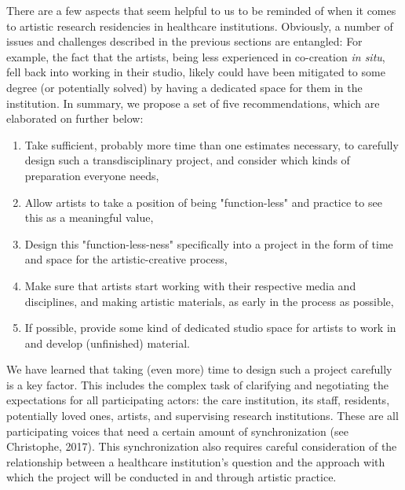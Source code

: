 \documentclass[authordate, empirical,issue]{jote-new-article}
\begin{document}
	{

	There are a few aspects that seem helpful to us to be reminded of when it comes to artistic research residencies in healthcare institutions. Obviously, a number of issues and challenges described in the previous sections are entangled: For example, the fact that the artists, being less experienced in co-creation \emph{in situ}, fell back into working in their studio, likely could have been mitigated to some degree (or potentially solved) by having a dedicated space for them in the institution. In summary, we propose a set of five recommendations, which are elaborated on further below:





	\begin{enumerate}


		\item Take sufficient, probably more time than one estimates necessary, to carefully design such a transdisciplinary project, and consider which kinds of preparation everyone needs,



		\item
		Allow artists to take a position of being "function-less" and practice to see this as a meaningful value,



		\item Design this "function-less-ness" specifically into a project in the form of time and space for the artistic-creative process,



		\item
		Make sure that artists start working with their respective media and disciplines, and making artistic materials, as early in the process as possible,



		\item If possible, provide some kind of dedicated studio space for artists to work in and develop (unfinished) material.


	\end{enumerate}





	We have learned that taking (even more) time to design such a project carefully is a key factor. This includes the complex task of clarifying and negotiating the expectations for all participating actors: the care institution, its staff, residents, potentially loved ones, artists, and supervising research institutions. These are all participating voices that need a certain amount of synchronization (see Christophe, 2017). This synchronization also requires careful consideration of the relationship between a healthcare institution's question and the approach with which the project will be conducted in and through artistic practice.







}
\end{document}
